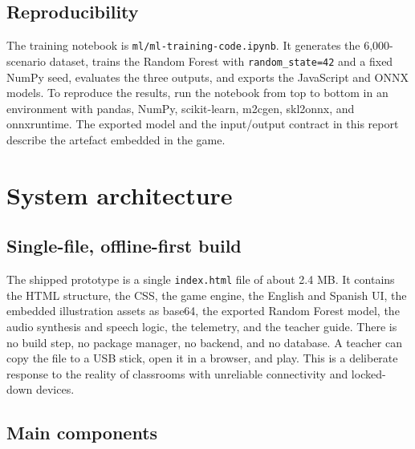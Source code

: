 \documentclass[11pt,a4paper]{article}
\newcommand{\code}[1]{\texttt{#1}}
\begin{document}
\subsection{Reproducibility}

The training notebook is \code{ml/ml-training-code.ipynb}. It generates the 6,000-scenario dataset, trains the Random Forest with \code{random\_state=42} and a fixed NumPy seed, evaluates the three outputs, and exports the JavaScript and ONNX models. To reproduce the results, run the notebook from top to bottom in an environment with pandas, NumPy, scikit-learn, m2cgen, skl2onnx, and onnxruntime. The exported model and the input/output contract in this report describe the artefact embedded in the game.

\section{System architecture}

\subsection{Single-file, offline-first build}

The shipped prototype is a single \code{index.html} file of about 2.4 MB. It contains the HTML structure, the CSS, the game engine, the English and Spanish UI, the embedded illustration assets as base64, the exported Random Forest model, the audio synthesis and speech logic, the telemetry, and the teacher guide. There is no build step, no package manager, no backend, and no database. A teacher can copy the file to a USB stick, open it in a browser, and play. This is a deliberate response to the reality of classrooms with unreliable connectivity and locked-down devices.

\subsection{Main components}
\end{document}
